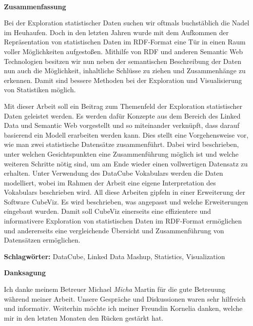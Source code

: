 \documentclass[11pt]{article}
\begin{document}
%
%
% 
%
\newpage\thispagestyle{empty}~ 
\newpage

\begin{center}
    \textbf{Zusammenfassung}
\end{center}

\noindent
Bei der Exploration statistischer Daten suchen wir oftmals buchstäblich die Nadel im Heuhaufen. Doch in den letzten Jahren wurde mit dem Aufkommen der Repräsentation von statistischen Daten im RDF-Format eine Tür in einen Raum voller Möglichkeiten aufgestoßen. Mithilfe von RDF und anderen Semantic Web Technologien besitzen wir nun neben der semantischen Beschreibung der Daten nun auch die Möglichkeit, inhaltliche Schlüsse zu ziehen und Zusammenhänge zu erkennen. Damit sind bessere Methoden bei der Exploration und Visualisierung von Statistiken möglich.

Mit dieser Arbeit soll ein Beitrag zum Themenfeld der Exploration statistischer Daten geleistet werden. Es werden dafür Konzepte aus dem Bereich des Linked Data und Semantic Web vorgestellt und so miteinander verknüpft, dass darauf basierend ein Modell erarbeiten werden kann. Dies stellt eine Vorgehensweise vor, wie man zwei statistische Datensätze zusammenführt. Dabei wird beschrieben, unter welchen Gesichtspunkten eine Zusammenführung möglich ist und welche weiteren Schritte nötig sind, um am Ende wieder einen vollwertigen Datensatz zu erhalten. Unter Verwendung des DataCube Vokabulars werden die Daten modelliert, wobei im Rahmen der Arbeit eine eigene Interpretation des Vokabulars beschrieben wird. All diese Arbeiten gipfeln in einer Erweiterung der Software CubeViz. Es wird beschrieben, was angepasst und welche Erweiterungen eingebaut wurden. Damit soll CubeViz einerseits eine effizientere und informativere Exploration von statistischen Daten im RDF-Format ermöglichen und andererseits eine vergleichende Übersicht und Zusammenführung von Datensätzen ermöglichen.


\vspace*{1.5cm}

\noindent
\textbf{Schlagwörter:} DataCube, Linked Data Mashup, Statistics, Visualization


%
%
\newpage

\noindent
{\Large \textbf{Danksagung}\\[0.5cm]}

\noindent
Ich danke meinem Betreuer Michael \textit{Micha} Martin für die gute Betreuung während meiner Arbeit. Unsere Gespräche und Diskussionen waren sehr hilfreich und informativ. Weiterhin möchte ich meiner Freundin Kornelia danken, welche mir in den letzten Monaten den Rücken gestärkt hat.
\end{document}
